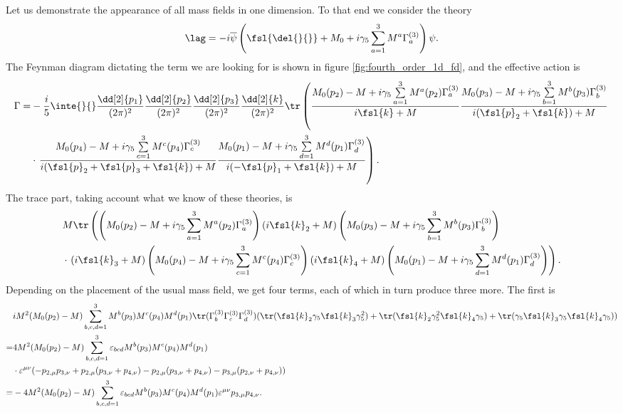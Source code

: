 Let us demonstrate the appearance of all mass fields in one dimension. To that end we consider the theory
\begin{align*}
	\lag = -i\overline{\psi}\left(\fsl{\del{}{}} + M_{0} + i\gamma_{5}\sum\limits_{a = 1}^{3}M^{a}\Gamma_{a}^{(3)}\right)\psi.
\end{align*}
The Feynman diagram dictating the term we are looking for is shown in figure \ref{fig:fourth_order_1d_fd}, and the effective action is
\begin{align*}
	\Gamma =& -\frac{i}{5}\inte{}{}\frac{\dd[2]{p_{1}}}{(2\pi)^{2}}\frac{\dd[2]{p_{2}}}{(2\pi)^{2}}\frac{\dd[2]{p_{3}}}{(2\pi)^{2}}\frac{\dd[2]{k}}{(2\pi)^{2}}\tr\left(\frac{M_{0}(p_{2}) - M + i\gamma_{5}\sum\limits_{a = 1}^{3}M^{a}(p_{2})\Gamma_{a}^{(3)}}{i\fsl{k} + M}\frac{M_{0}(p_{3}) - M + i\gamma_{5}\sum\limits_{b = 1}^{3}M^{b}(p_{3})\Gamma_{b}^{(3)}}{i(\fsl{p}_{2} + \fsl{k}) + M} \right. \\
	&\cdot \left. \frac{M_{0}(p_{4}) - M + i\gamma_{5}\sum\limits_{c = 1}^{3}M^{c}(p_{4})\Gamma_{c}^{(3)}}{i(\fsl{p}_{2} + \fsl{p}_{3} + \fsl{k}) + M}\frac{M_{0}(p_{1}) - M + i\gamma_{5}\sum\limits_{d = 1}^{3}M^{d}(p_{1})\Gamma_{d}^{(3)}}{i(-\fsl{p}_{1} + \fsl{k}) + M}\right).
\end{align*}
The trace part, taking account what we know of these theories, is
\begin{align*}
	&M\tr\left(\left(M_{0}(p_{2}) - M + i\gamma_{5}\sum\limits_{a = 1}^{3}M^{a}(p_{2})\Gamma_{a}^{(3)}\right)(i\fsl{k}_{2} + M)\left(M_{0}(p_{3}) - M + i\gamma_{5}\sum\limits_{b = 1}^{3}M^{b}(p_{3})\Gamma_{b}^{(3)}\right) \right. \\
	&\cdot \left. (i\fsl{k}_{3} + M)\left(M_{0}(p_{4}) - M + i\gamma_{5}\sum\limits_{c = 1}^{3}M^{c}(p_{4})\Gamma_{c}^{(3)}\right)(i\fsl{k}_{4} + M)\left(M_{0}(p_{1}) - M + i\gamma_{5}\sum\limits_{d = 1}^{3}M^{d}(p_{1})\Gamma_{d}^{(3)}\right)\right).
\end{align*}
Depending on the placement of the usual mass field, we get four terms, each of which in turn produce three more. The first is
\begin{align*}
	 &iM^{2}(M_{0}(p_{2}) - M)\sum\limits_{b, c, d = 1}^{3}M^{b}(p_{3})M^{c}(p_{4})M^{d}(p_{1})\tr(\Gamma_{b}^{(3)}\Gamma_{c}^{(3)}\Gamma_{d}^{(3)})(\tr(\fsl{k}_{2}\gamma_{5}\fsl{k}_{3}\gamma_{5}^{2}) + \tr(\fsl{k}_{2}\gamma_{5}^{2}\fsl{k}_{4}\gamma_{5}) + \tr(\gamma_{5}\fsl{k}_{3}\gamma_{5}\fsl{k}_{4}\gamma_{5})) \\
	=& 4M^{2}(M_{0}(p_{2}) - M)\sum\limits_{b, c, d = 1}^{3}\varepsilon_{bcd}M^{b}(p_{3})M^{c}(p_{4})M^{d}(p_{1}) \\
	 &\cdot\varepsilon^{\mu\nu}(-p_{2, \mu}p_{3, \nu} + p_{2, \mu}(p_{3, \nu} + p_{4, \nu}) - p_{2, \mu}(p_{3, \nu} + p_{4, \nu}) - p_{3, \mu}(p_{2, \nu} + p_{4, \nu})) \\
	=& -4M^{2}(M_{0}(p_{2}) - M)\sum\limits_{b, c, d = 1}^{3}\varepsilon_{bcd}M^{b}(p_{3})M^{c}(p_{4})M^{d}(p_{1})\varepsilon^{\mu\nu}p_{3, \mu}p_{4, \nu}.
\end{align*}
